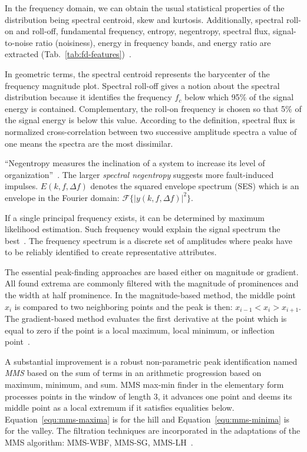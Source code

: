 In the frequency domain, we can obtain the usual statistical properties of the distribution being spectral centroid, skew and kurtosis. Additionally, spectral roll-on and roll-off, fundamental frequency, entropy, negentropy, spectral flux, signal-to-noise ratio (noisiness), energy in frequency bands, and energy ratio are extracted (Tab.~\ref{tab:fd-features})~\cite{peeters_large_2004}. 

In geometric terms, the spectral centroid represents the barycenter of the frequency magnitude plot. Spectral roll-off gives a notion about the spectral distribution because it identifies the frequency $f_c$ below which 95\% of the signal energy is contained. Complementary, the roll-on frequency is chosen so that 5\% of the signal energy is below this value. According to the definition, spectral flux is normalized cross-correlation between two successive amplitude spectra a value of one means the spectra are the most dissimilar.

``Negentropy measures the inclination of a system to increase its level of organization''~\cite{avoci_spectral_2020}. The larger \emph{spectral negentropy} suggests more fault-induced impulses. $E(k, f, \Delta f)$ denotes the squared envelope spectrum (SES) which is an envelope in the Fourier domain: $\mathcal{F}\{ |y(k, f, \Delta f)|^2 \}$.

If a single principal frequency exists, it can be determined by maximum likelihood estimation. Such frequency would explain the signal spectrum the best~\cite{peeters_large_2004}. The frequency spectrum is a discrete set of amplitudes where peaks have to be reliably identified to create representative attributes.

The essential peak-finding approaches are based either on magnitude or gradient. All found extrema are commonly filtered with the magnitude of prominences and the width at half prominence. In the magnitude-based method, the middle point $x_i$ is compared to two neighboring points and the peak is then: $x_{i-1} < x_i > x_{i+1}$. The gradient-based method evaluates the first derivative at the point which is equal to zero if the point is a local maximum, local minimum, or inflection point~\cite{adikaram_non-parametric_2016}.

A substantial improvement is a robust non-parametric peak identification named \emph{MMS} based on the sum of terms in an arithmetic progression based on maximum, minimum, and sum. MMS max-min finder in the elementary form processes points in the window of length 3, it advances one point and deems its middle point as a local extremum if it satisfies equalities below. Equation~\ref{equ:mms-maxima} is for the hill and Equation~\ref{equ:mms-minima} is for the valley. The filtration techniques are incorporated in the adaptations of the MMS algorithm: MMS-WBF, MMS-SG, MMS-LH~\cite{adikaram_non-parametric_2016}.

